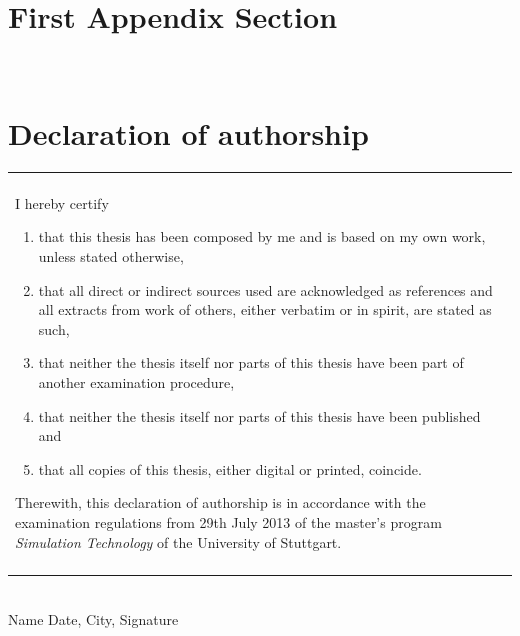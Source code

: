 \documentclass[twoside,a4paper]{article}
\begin{document}
%
%
\clearpage\newpage\null %
\newpage
\begin{appendices}
\section{First Appendix Section}

\newpage~\newpage
\section{Declaration of authorship}

\vspace{3cm}

\begin{table}[h!]
\centering
\begin{tabular}{|p{13cm}|}
\hline\\
	I hereby certify
	\begin{enumerate}
		\item that this thesis has been composed by me and is based on my own work, unless stated otherwise,
		\item that all direct or indirect sources used are acknowledged as references and all extracts from work of others, either verbatim or in spirit, are stated as such,
		\item that neither the thesis itself nor parts of this thesis have been part of another examination procedure,
		\item that neither the thesis itself nor parts of this thesis have been published and
		\item that all copies of this thesis, either digital or printed, coincide.
	\end{enumerate}
	Therewith, this declaration of authorship is in accordance with the examination regulations from 29th July 2013 of the master's program \emph{Simulation Technology} of the University of Stuttgart.\\\\
\hline
\end{tabular}
\end{table}

\vspace{4cm}
\hrulefill\\
Name
\hspace{7cm}
Date, City, Signature
\end{appendices}
%
%
\clearpage\newpage\null %
\newpage
{}


\end{document}
